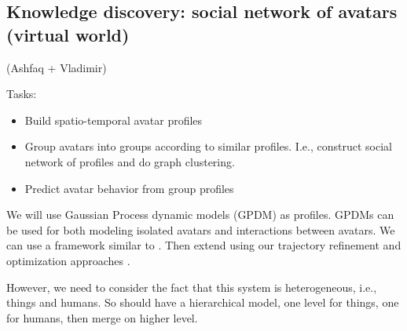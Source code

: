 \subsection{Knowledge discovery: social network of avatars (virtual world)}
(Ashfaq + Vladimir)

Tasks:
\begin{itemize}
	\item Build spatio-temporal avatar profiles
	\item Group avatars into groups according to similar profiles. I.e., construct social network of profiles and do graph clustering.
	\item Predict avatar behavior from group profiles
\end{itemize}


We will use Gaussian Process dynamic models (GPDM) as profiles. GPDMs can be used for both modeling isolated avatars and interactions between avatars.  We can use a framework similar to \cite{Shen2015-jr,Shen2015-ft,Shen2012-vi}.  Then extend using our trajectory refinement and optimization approaches \cite{yoon2016}.

However, we need to consider the fact that this system is heterogeneous, i.e., things and humans.  So should have a hierarchical model, one level for things, one for humans, then merge on higher level.
